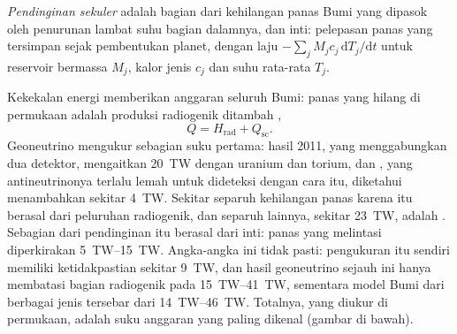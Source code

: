 \begin{definition}\label{def:b1:heat-budget:secular-cooling}
\emph{Pendinginan sekuler} adalah bagian dari kehilangan panas Bumi yang dipasok oleh penurunan lambat suhu bagian dalamnya,  dan inti: pelepasan panas yang tersimpan sejak pembentukan planet, dengan laju $-\sum_j M_j c_j\,\mathrm dT_j/\mathrm dt$ untuk reservoir bermassa $M_j$, kalor jenis $c_j$ dan suhu rata-rata $T_j$.
\end{definition}

Kekekalan energi memberikan anggaran seluruh Bumi: panas yang hilang di permukaan adalah produksi radiogenik ditambah ,
\[
  Q = H_{\text{rad}} + Q_{\text{sc}} .
\]
Geoneutrino mengukur sebagian suku pertama: hasil 2011, yang menggabungkan dua detektor, mengaitkan \qty{20}{TW} dengan uranium dan torium, dan , yang antineutrinonya terlalu lemah untuk dideteksi dengan cara itu, diketahui menambahkan sekitar \qty{4}{TW}.
Sekitar separuh kehilangan panas karena itu berasal dari peluruhan radiogenik, dan separuh lainnya, sekitar \qty{23}{TW}, adalah . Sebagian dari pendinginan itu berasal dari inti: panas yang melintasi  diperkirakan \qtyrange{5}{15}{TW}. Angka-angka ini tidak pasti: pengukuran itu sendiri memiliki ketidakpastian sekitar \qty{9}{TW}, dan hasil geoneutrino sejauh ini hanya membatasi bagian radiogenik pada \qtyrange{15}{41}{TW}, sementara model Bumi dari berbagai jenis tersebar dari \qtyrange{14}{46}{TW}. Totalnya, yang diukur di permukaan, adalah suku anggaran yang paling dikenal (gambar di bawah).

